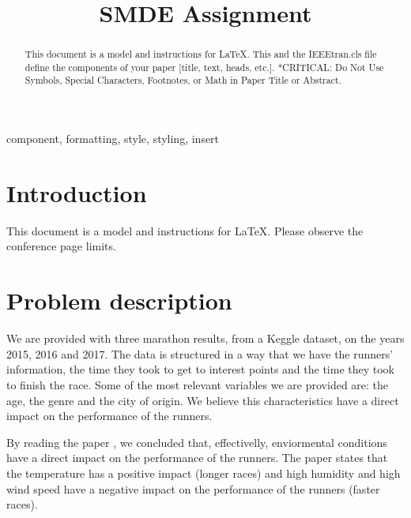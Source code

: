 \documentclass[conference]{IEEEtran}
\begin{document}
\title{SMDE Assignment}

\author{
\and
{}
\and
{}
}

\maketitle

\begin{abstract}
This document is a model and instructions for \LaTeX.
This and the IEEEtran.cls file define the components of your paper [title, text, heads, etc.]. *CRITICAL: Do Not Use Symbols, Special Characters, Footnotes, 
or Math in Paper Title or Abstract.
\end{abstract}

\begin{IEEEkeywords}
component, formatting, style, styling, insert
\end{IEEEkeywords}

\section*{Introduction}
This document is a model and instructions for \LaTeX.
Please observe the conference page limits. 

\section{Problem description}
We are provided with three marathon results, from a Keggle dataset, on the years 2015, 2016 and 2017. The data is structured in a way that we have the runners' information, the time they took to get to interest points and the time they took to finish the race. Some of the most relevant variables we are provided are: the age, the genre and the city of origin. We believe this characteristics have a direct impact on the performance of the runners.

By reading the paper \cite{b8}, we concluded that, effectivelly, enviormental conditions have a direct impact on the performance of the runners. The paper states that the temperature has a positive impact (longer races) and high humidity and high wind speed have a negative impact on the performance of the runners (faster races).
\end{document}
